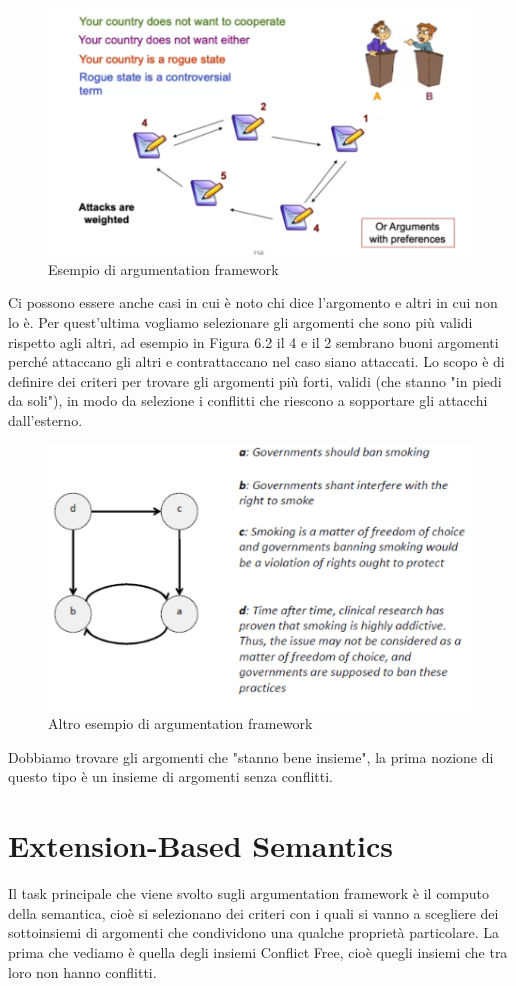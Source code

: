 \begin{figure}[H]
    \centering
    \includegraphics[width=12cm, keepaspectratio]{img/Cap6/arg2.png}
    \caption{Esempio di argumentation framework}
\end{figure}
Ci possono essere anche casi in cui è noto chi dice l'argomento e altri in cui non lo è. Per quest'ultima vogliamo selezionare gli argomenti che sono più validi rispetto agli altri, ad esempio in Figura 6.2 il 4 e il 2 sembrano buoni argomenti perché attaccano gli altri e contrattaccano nel caso siano attaccati. Lo scopo è di definire dei criteri per trovare gli argomenti più forti, validi (che stanno "in piedi da soli"), in modo da selezione i conflitti che riescono a sopportare gli attacchi dall'esterno.
\begin{figure}[H]
    \centering
    \includegraphics[width=12cm, keepaspectratio]{img/Cap6/arg3.png}
    \caption{Altro esempio di argumentation framework}
\end{figure}
Dobbiamo trovare gli argomenti che "stanno bene insieme", la prima nozione di questo tipo è un insieme di argomenti senza conflitti.

\section{Extension-Based Semantics}
Il task principale che viene svolto sugli argumentation framework è il computo della semantica, cioè si selezionano dei criteri con i quali si vanno a scegliere dei sottoinsiemi di argomenti che condividono una qualche proprietà particolare. La prima che vediamo è quella degli insiemi Conflict Free, cioè quegli insiemi che tra loro non hanno conflitti.
